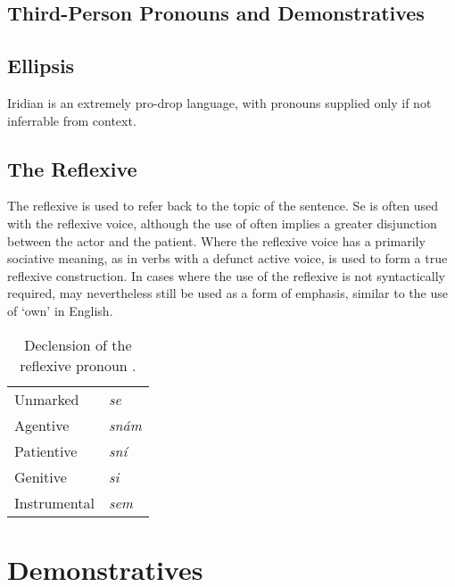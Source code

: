 \subsection{Third-Person Pronouns and Demonstratives}


\subsection{Ellipsis}
Iridian is an extremely pro-drop language, with pronouns supplied only if not inferrable from context.


\subsection{The Reflexive }

The reflexive  is used to refer back to the topic of the sentence. Se is often used with the reflexive voice, although the use of  often implies a greater disjunction between the actor and the patient. Where the reflexive voice has a primarily sociative meaning, as in verbs with a defunct active voice,  is used to form a true reflexive construction. In cases where the use of the reflexive is not syntactically required,  may nevertheless still be used as a form of emphasis, similar to the use of `own' in English.

\pex    \a {}
        \a {}
\xe

\pex
        \a {}
        \a {} 
\xe


\begin{table}
    \small
    \caption{Declension of the reflexive pronoun .}
    \medskip
    \begin{tabu} to 0.5 
        \toprule
        Unmarked        & se\\
        Agentive        & snám\\
        Patientive      & sní\\
        Genitive        & si\\
        Instrumental    & sem\\
        \bottomrule
    \end{tabu}
\end{table}


\section{Demonstratives}

